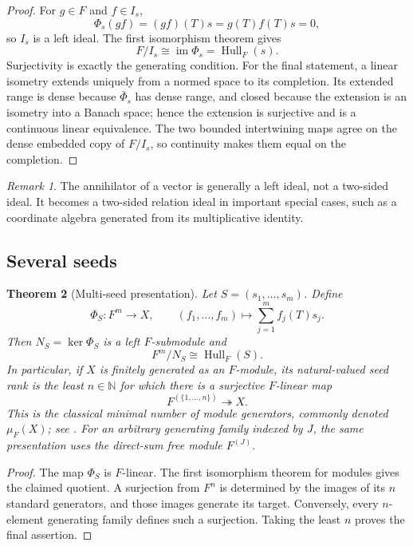 \documentclass[11pt]{article}
\newtheorem{theorem}{Theorem}[section]
\theoremstyle{definition}
\theoremstyle{remark}
\newtheorem{remark}[theorem]{Remark}
\newcommand{\Hull}{\operatorname{Hull}}
\newcommand{\im}{\operatorname{im}}
\newcommand{\N}{\mathbb N}
\begin{document}
\begin{proof}
For $g\in F$ and $f\in I_s$,
\[
\Phi_s(gf)=(gf)(T)s=g(T)f(T)s=0,
\]
so $I_s$ is a left ideal. The first isomorphism theorem gives
\[
F/I_s\cong\im\Phi_s=\Hull_F(s).
\]
Surjectivity is exactly the generating condition. For the final statement, a linear isometry extends uniquely from a normed space to its completion. Its extended range is dense because $\bar\Phi_s$ has dense range, and closed because the extension is an isometry into a Banach space; hence the extension is surjective and is a continuous linear equivalence. The two bounded intertwining maps agree on the dense embedded copy of $F/I_s$, so continuity makes them equal on the completion.
\end{proof}

\begin{remark}
The annihilator of a vector is generally a left ideal, not a two-sided ideal. It becomes a two-sided relation ideal in important special cases, such as a coordinate algebra generated from its multiplicative identity.
\end{remark}

\subsection{Several seeds}

\begin{theorem}[Multi-seed presentation]
\label{thm:multi-seed-presentation}
Let $S=(s_1,\ldots,s_m)$. Define
\[
\Phi_S:F^m\longrightarrow X,
\qquad
(f_1,\ldots,f_m)\longmapsto\sum_{j=1}^m f_j(T)s_j.
\]
Then $N_S=\ker\Phi_S$ is a left $F$-submodule and
\[
{
F^m/N_S\cong\Hull_F(S).
}
\]
In particular, if $X$ is finitely generated as an $F$-module, its natural-valued seed rank is the least $n\in\N$ for which there is a surjective $F$-linear map
\[
F^{(\{1,\ldots,n\})}\twoheadrightarrow X.
\]
This is the classical minimal number of module generators, commonly denoted $\mu_F(X)$; see \cite{lam1999modules}. For an arbitrary generating family indexed by $J$, the same presentation uses the direct-sum free module $F^{(J)}$.
\end{theorem}

\begin{proof}
The map $\Phi_S$ is $F$-linear. The first isomorphism theorem for modules gives the claimed quotient. A surjection from $F^n$ is determined by the images of its $n$ standard generators, and those images generate its target. Conversely, every $n$-element generating family defines such a surjection. Taking the least $n$ proves the final assertion.
\end{proof}
\end{document}

